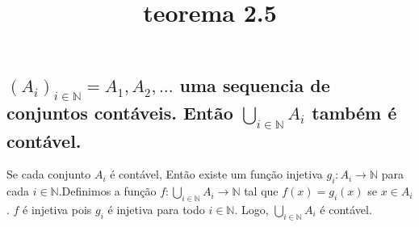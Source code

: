 \title{teorema 2.5}

\subsection{$(A_i)_{i\in \mathbb{N}}=A_1, A_2, \hdots$ uma sequencia de conjuntos contáveis. Então $\bigcup\limits_{i \in \mathbb{N}} A_i$ também é contável.}

\begin{spacing}{1.5}
  Se cada conjunto $A_i$ é contável, Então existe um função injetiva $g_i:A_i \rightarrow \mathbb{N}$ para cada $i \in \mathbb{N}$.Definimos a função $f: \bigcup\limits_{i \in \mathbb{N}} A_i \rightarrow \mathbb{N}$ tal que $f(x) = g_i(x)$ se $x \in A_i$. $f$ é injetiva pois $g_i$ é injetiva para todo $i \in \mathbb{N}$. Logo, $\bigcup\limits_{i \in \mathbb{N}} A_i$ é contável.
\end{spacing}